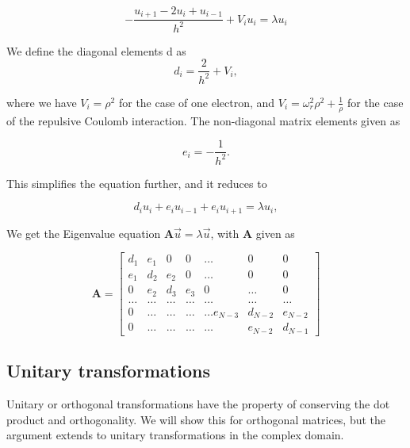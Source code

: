 \documentclass{emulateapj}
\begin{document}
\begin{equation}
-\frac{u_{i+1} -2u_i +u_{i-1} }{h^2}+V_iu_i  = \lambda u_i
\end{equation}

We define the diagonal elements d as
\begin{equation}
   d_i=\frac{2}{h^2}+V_i,
\end{equation}

where we have $V_i = \rho^2$ for the case of one electron, and $V_i = \omega_r^2 \rho^2 + \frac{1}{\rho}$ for the case of the repulsive Coulomb interaction. The non-diagonal matrix elements given as

\begin{equation}
   e_i=-\frac{1}{h^2}.
\end{equation}

This simplifies the equation further, and it reduces to

\begin{equation}
d_iu_i+e_{i}u_{i-1}+e_{i}u_{i+1}  = \lambda u_i,
\end{equation}

We get the Eigenvalue equation $\mathbf{A}\vec{u} = \lambda \vec{u}$, with $\mathbf{A}$ given as

\begin{equation}
    \mathbf{A} =
    \begin{bmatrix}d_1 & e_1 & 0   & 0    & \dots  &0     & 0 \\
                                e_1 & d_2 & e_2 & 0    & \dots  &0     &0 \\
                                0   & e_2 & d_3 & e_3  &0       &\dots & 0\\
                                \dots  & \dots & \dots & \dots  &\dots      &\dots & \dots\\
                                0   & \dots & \dots & \dots  &\dots  e_{N-3}     &d_{N-2} & e_{N-2}\\
                                0   & \dots & \dots & \dots  &\dots       &e_{N-2} & d_{N-1}
             \end{bmatrix}
      \label{eq:sematrix}
\end{equation}

\subsection{Unitary transformations}
Unitary or orthogonal transformations have the property of conserving the dot product and orthogonality. We will show this for orthogonal matrices, but the argument extends to unitary transformations in the complex domain.
\end{document}
